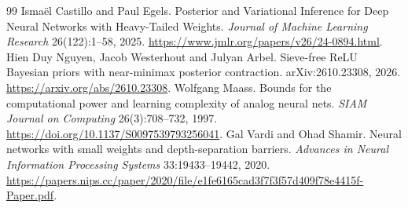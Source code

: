 \documentclass[11pt]{article}
\begin{document}
\begin{thebibliography}{99}
 Isma\"el Castillo and Paul Egels. Posterior and Variational Inference for Deep Neural Networks with Heavy-Tailed Weights. \emph{Journal of Machine Learning Research} 26(122):1--58, 2025. \url{https://www.jmlr.org/papers/v26/24-0894.html}.
 Hien Duy Nguyen, Jacob Westerhout and Julyan Arbel. Sieve-free ReLU Bayesian priors with near-minimax posterior contraction. arXiv:2610.23308, 2026. \url{https://arxiv.org/abs/2610.23308}.
 Wolfgang Maass. Bounds for the computational power and learning complexity of analog neural nets. \emph{SIAM Journal on Computing} 26(3):708--732, 1997. \url{https://doi.org/10.1137/S0097539793256041}.
 Gal Vardi and Ohad Shamir. Neural networks with small weights and depth-separation barriers. \emph{Advances in Neural Information Processing Systems} 33:19433--19442, 2020. \url{https://papers.nips.cc/paper/2020/file/e1fe6165cad3f7f3f57d409f78e4415f-Paper.pdf}.
\end{thebibliography}
\end{document}
